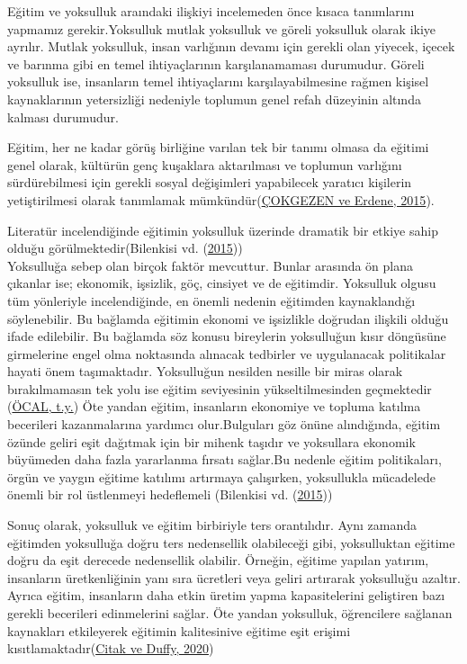 \documentclass[
  12pt,
]{article}
\begin{document}
Eğitim ve yoksulluk araındaki ilişkiyi incelemeden önce kısaca tanımlarını yapmamız gerekir.Yoksulluk mutlak yoksulluk ve göreli yoksulluk olarak ikiye ayrılır. Mutlak yoksulluk, insan varlığının devamı için gerekli olan yiyecek, içecek ve barınma gibi en temel ihtiyaçlarının karşılanamaması durumudur. Göreli yoksulluk ise, insanların temel ihtiyaçlarını karşılayabilmesine rağmen kişisel kaynaklarının yetersizliği nedeniyle toplumun genel refah düzeyinin altında kalması durumudur.

Eğitim, her ne kadar görüş birliğine varılan tek bir tanımı olmasa da eğitimi genel olarak, kültürün genç kuşaklara aktarılması ve toplumun varlığını sürdürebilmesi için gerekli sosyal değişimleri yapabilecek yaratıcı kişilerin yetiştirilmesi olarak tanımlamak mümkündür(\protect\hyperlink{ref-ccokgezen2015gelicsmekte}{ÇOKGEZEN ve Erdene, 2015}).

Literatür incelendiğinde eğitimin yoksulluk üzerinde dramatik bir etkiye sahip olduğu görülmektedir(Bilenkisi vd. (\protect\hyperlink{ref-bilenkisi2015impact}{2015}))\\
Yoksulluğa sebep olan birçok faktör mevcuttur. Bunlar arasında ön plana çıkanlar ise; ekonomik, işsizlik, göç, cinsiyet ve de eğitimdir. Yoksulluk olgusu tüm yönleriyle incelendiğinde, en önemli nedenin eğitimden kaynaklandığı söylenebilir. Bu bağlamda eğitimin ekonomi ve işsizlikle doğrudan ilişkili olduğu ifade edilebilir.
Bu bağlamda söz konusu bireylerin yoksulluğun kısır döngüsüne girmelerine engel olma noktasında alınacak tedbirler ve uygulanacak politikalar hayati önem taşımaktadır. Yoksulluğun nesilden nesille bir miras olarak bırakılmamasın tek yolu ise eğitim seviyesinin yükseltilmesinden geçmektedir (\protect\hyperlink{ref-ocalguncel}{ÖCAL, t.y.})
Öte yandan eğitim, insanların ekonomiye ve topluma katılma becerileri kazanmalarına yardımcı olur.Bulguları göz önüne alındığında, eğitim özünde geliri eşit dağıtmak için bir mihenk taşıdır ve yoksullara ekonomik büyümeden daha fazla yararlanma fırsatı sağlar.Bu nedenle eğitim politikaları, örgün ve yaygın eğitime katılımı artırmaya çalışırken, yoksullukla mücadelede önemli bir rol üstlenmeyi hedeflemeli (Bilenkisi vd. (\protect\hyperlink{ref-bilenkisi2015impact}{2015}))

Sonuç olarak, yoksulluk ve eğitim birbiriyle ters orantılıdır.
Aynı zamanda eğitimden yoksulluğa doğru ters nedensellik olabileceği gibi, yoksulluktan eğitime doğru da eşit derecede nedensellik olabilir. Örneğin, eğitime yapılan yatırım, insanların üretkenliğinin yanı sıra ücretleri veya geliri artırarak yoksulluğu azaltır. Ayrıca eğitim, insanların daha etkin üretim yapma kapasitelerini geliştiren bazı gerekli becerileri edinmelerini sağlar. Öte yandan yoksulluk, öğrencilere sağlanan kaynakları etkileyerek eğitimin kalitesinive eğitime eşit erişimi kısıtlamaktadır(\protect\hyperlink{ref-citak2020causal}{Citak ve Duffy, 2020})
\end{document}
